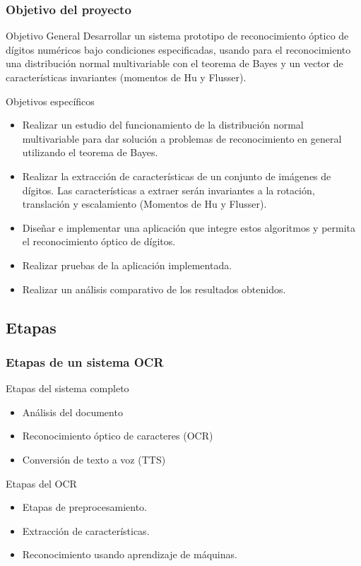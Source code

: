 \documentclass{beamer}
\begin{document}
	\begin{frame}
		\frametitle{Objetivo del proyecto}
		\begin{block}{Objetivo General}
		Desarrollar un sistema prototipo de reconocimiento óptico de dígitos numéricos bajo condiciones especificadas, usando para el reconocimiento una distribución normal multivariable con el teorema de Bayes y un vector de características invariantes (momentos de Hu y Flusser).
		\end{block}
		\pause
		\begin{block}{Objetivos específicos}
			\begin{itemize}
			\item Realizar un estudio del funcionamiento de la distribución normal multivariable para dar solución a problemas de reconocimiento en general utilizando el teorema de Bayes. 
			\item Realizar la extracción de características de un conjunto de imágenes de dígitos. Las características a extraer serán invariantes a la rotación, translación y escalamiento (Momentos de Hu y Flusser).
			\item Diseñar e implementar una aplicación que integre estos algoritmos y permita el reconocimiento óptico de dígitos.
			\item Realizar pruebas de la aplicación implementada.
			\item Realizar un análisis comparativo de los resultados obtenidos. 
			\end{itemize}
		\end{block}
	\end{frame}
	
	\subsection{Etapas}
	\begin{frame}
		\frametitle{Etapas de un sistema OCR}
		\begin{block}{Etapas del sistema completo}
		\begin{itemize}
			\item Análisis del documento \pause
			\item Reconocimiento óptico de caracteres (OCR) \pause
			\item Conversión de texto a voz (TTS)\pause
		\end{itemize}
		\end{block}
		\begin{block}{Etapas del OCR}
		\begin{itemize}
			\item Etapas de preprocesamiento. \pause
			\item Extracción de características. \pause
			\item Reconocimiento usando aprendizaje de máquinas.
		\end{itemize}
		\end{block}
	\end{frame}
	
\end{document}
